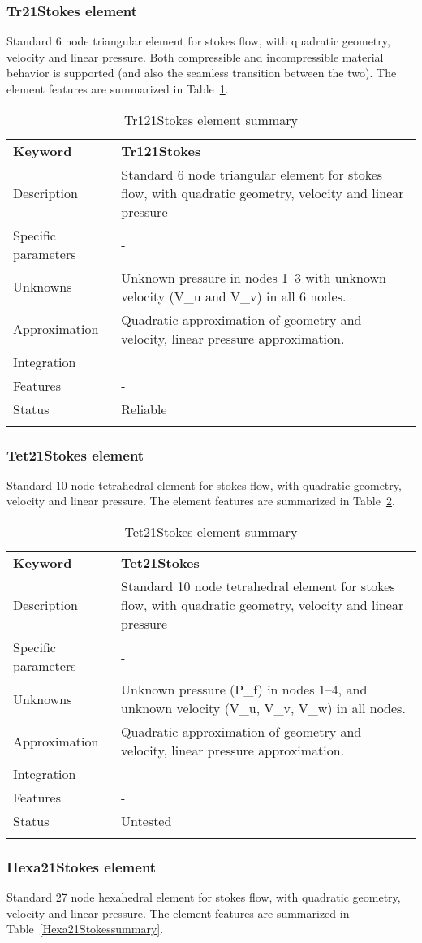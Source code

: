\documentclass[a4paper]{article}
\newcommand{\param}[1]{\texttt{#1}} %
\newcommand{\templabel}{}%
\newcommand{\tempcaption}{}%
\newcounter{nelpar}
\newenvironment{elementsummary}[5]{%
  \gdef\tempcaption{#4}%
  \gdef\templabel{#5}%
  \setcounter{nelpar}{0}%
  \begin{center} %
    \begin{table}[!htb] %
      \begin{tabular}{|l|p{9cm}|}\hline %
        {\bf Keyword} & \bf{#1}\\ %
        {Description} & {#2}\\ %
        {Specific parameters} & {#3}\\ \hline %
}{
  \\ \hline %
      \end{tabular}%
      \caption{\tempcaption}%
      \label{\templabel}%
    \end{table}%
  \end{center}%
}
\newcommand{\elementParam}[1]{%
  \ifthenelse{\value{nelpar}>0} %
             {&{#1}}%
             {\setcounter{nelpar}{1}Parameters&{#1}}%
             \\%
}
\newcommand{\elementDescription}[2]{{#1} & {#2}\\ }
\begin{document}
\subsubsection{Tr21Stokes element}
Standard 6 node triangular element for stokes flow, with quadratic geometry, velocity and linear pressure.
Both compressible and incompressible material behavior is supported (and also the seamless transition between the two).
The element features are summarized in Table~\ref{Tr121Stokessummary}.

\begin{elementsummary}{Tr121Stokes}{Standard 6 node triangular element for stokes flow, with quadratic geometry, velocity and linear pressure}{-}{Tr121Stokes element summary}{Tr121Stokessummary}
\elementDescription{Unknowns}{Unknown pressure in nodes 1--3 with unknown velocity (V\_u and V\_v) in all 6 nodes.}
\elementDescription{Approximation}{Quadratic approximation of geometry and velocity, linear pressure approximation.}
\elementDescription{Integration}{}
\elementDescription{Features}{-}
\elementDescription{Status}{Reliable}
\end{elementsummary}

\subsubsection{Tet21Stokes element}
Standard 10 node tetrahedral element for stokes flow, with quadratic geometry, velocity and linear pressure. The element features are summarized in Table~\ref{Tet21Stokessummary}.

\begin{elementsummary}{Tet21Stokes}{Standard 10 node tetrahedral element for stokes flow, with quadratic geometry, velocity and linear pressure}{-}{Tet21Stokes element summary}{Tet21Stokessummary}
\elementDescription{Unknowns}{Unknown pressure (P\_f) in nodes 1--4, and unknown velocity (V\_u, V\_v, V\_w) in all nodes.}
\elementDescription{Approximation}{Quadratic approximation of geometry and velocity, linear pressure approximation.}
\elementDescription{Integration}{}
\elementDescription{Features}{-}
\elementDescription{Status}{Untested}
\end{elementsummary}

\subsubsection{Hexa21Stokes element}
Standard 27 node hexahedral element for stokes flow, with quadratic geometry, velocity and linear pressure. The element features are summarized in Table~\ref{Hexa21Stokessummary}.
\end{document}
